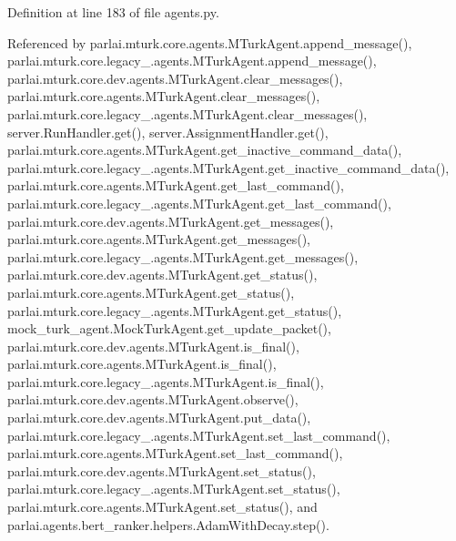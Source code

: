 Definition at line 183 of file agents.\+py.



Referenced by parlai.\+mturk.\+core.\+agents.\+M\+Turk\+Agent.\+append\+\_\+message(), parlai.\+mturk.\+core.\+legacy\+\_.\+agents.\+M\+Turk\+Agent.\+append\+\_\+message(), parlai.\+mturk.\+core.\+dev.\+agents.\+M\+Turk\+Agent.\+clear\+\_\+messages(), parlai.\+mturk.\+core.\+agents.\+M\+Turk\+Agent.\+clear\+\_\+messages(), parlai.\+mturk.\+core.\+legacy\+\_.\+agents.\+M\+Turk\+Agent.\+clear\+\_\+messages(), server.\+Run\+Handler.\+get(), server.\+Assignment\+Handler.\+get(), parlai.\+mturk.\+core.\+agents.\+M\+Turk\+Agent.\+get\+\_\+inactive\+\_\+command\+\_\+data(), parlai.\+mturk.\+core.\+legacy\+\_.\+agents.\+M\+Turk\+Agent.\+get\+\_\+inactive\+\_\+command\+\_\+data(), parlai.\+mturk.\+core.\+agents.\+M\+Turk\+Agent.\+get\+\_\+last\+\_\+command(), parlai.\+mturk.\+core.\+legacy\+\_.\+agents.\+M\+Turk\+Agent.\+get\+\_\+last\+\_\+command(), parlai.\+mturk.\+core.\+dev.\+agents.\+M\+Turk\+Agent.\+get\+\_\+messages(), parlai.\+mturk.\+core.\+agents.\+M\+Turk\+Agent.\+get\+\_\+messages(), parlai.\+mturk.\+core.\+legacy\+\_.\+agents.\+M\+Turk\+Agent.\+get\+\_\+messages(), parlai.\+mturk.\+core.\+dev.\+agents.\+M\+Turk\+Agent.\+get\+\_\+status(), parlai.\+mturk.\+core.\+agents.\+M\+Turk\+Agent.\+get\+\_\+status(), parlai.\+mturk.\+core.\+legacy\+\_.\+agents.\+M\+Turk\+Agent.\+get\+\_\+status(), mock\+\_\+turk\+\_\+agent.\+Mock\+Turk\+Agent.\+get\+\_\+update\+\_\+packet(), parlai.\+mturk.\+core.\+dev.\+agents.\+M\+Turk\+Agent.\+is\+\_\+final(), parlai.\+mturk.\+core.\+agents.\+M\+Turk\+Agent.\+is\+\_\+final(), parlai.\+mturk.\+core.\+legacy\+\_.\+agents.\+M\+Turk\+Agent.\+is\+\_\+final(), parlai.\+mturk.\+core.\+dev.\+agents.\+M\+Turk\+Agent.\+observe(), parlai.\+mturk.\+core.\+dev.\+agents.\+M\+Turk\+Agent.\+put\+\_\+data(), parlai.\+mturk.\+core.\+legacy\+\_.\+agents.\+M\+Turk\+Agent.\+set\+\_\+last\+\_\+command(), parlai.\+mturk.\+core.\+agents.\+M\+Turk\+Agent.\+set\+\_\+last\+\_\+command(), parlai.\+mturk.\+core.\+dev.\+agents.\+M\+Turk\+Agent.\+set\+\_\+status(), parlai.\+mturk.\+core.\+legacy\+\_.\+agents.\+M\+Turk\+Agent.\+set\+\_\+status(), parlai.\+mturk.\+core.\+agents.\+M\+Turk\+Agent.\+set\+\_\+status(), and parlai.\+agents.\+bert\+\_\+ranker.\+helpers.\+Adam\+With\+Decay.\+step().

\mbox{\label{classparlai_1_1mturk_1_1core_1_1agents_1_1MTurkAgent_abf512fbe295ddca93d2489fc5abe4732}} 
